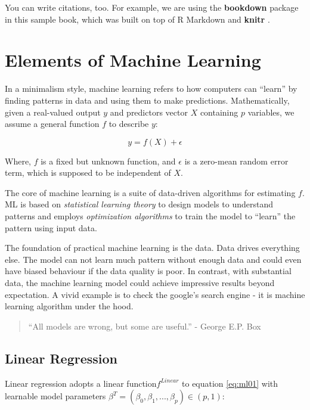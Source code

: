 \documentclass[
]{book}
\begin{document}
You can write citations, too. For example, we are using the \textbf{bookdown} package \citep{R-bookdown} in this sample book, which was built on top of R Markdown and \textbf{knitr} \citep{xie2015}.

\hypertarget{elements-of-machine-learning}{%
\chapter{Elements of Machine Learning}\label{elements-of-machine-learning}}

In a minimalism style, machine learning refers to how computers can ``learn'' by finding patterns in data and using them to make predictions. Mathematically, given a real-valued output \(y\) and predictors vector \(X\) containing \(p\) variables, we assume a general function \(f\) to describe \(y\):

\begin{equation} 
y = f(X) + \epsilon
\label{eq:ml01}
\end{equation}

Where, \(f\) is a fixed but unknown function, and \(\epsilon\) is a zero-mean random error term, which is supposed to be independent of \(X\).

The core of machine learning is a suite of data-driven algorithms for estimating \(f\). ML is based on {\emph{statistical learning theory}} to design models to understand patterns and employs {\emph{optimization algorithms}} to train the model to ``learn'' the pattern using input data.

The foundation of practical machine learning is the data. Data drives everything else. The model can not learn much pattern without enough data and could even have biased behaviour if the data quality is poor. In contrast, with substantial data, the machine learning model could achieve impressive results beyond expectation. A vivid example is to check the google's search engine - it is machine learning algorithm under the hood.

\begin{quote}
``All models are wrong, but some are useful.'' - George E.P. Box
\end{quote}

\hypertarget{linear-regression}{%
\section{Linear Regression}\label{linear-regression}}

Linear regression adopts a linear function\(f^{Linear}\) to equation \eqref{eq:ml01} with learnable model parameters \(\beta^T =(\beta_0,\beta_1,...,\beta_p) \in (p,1)\):
\end{document}
